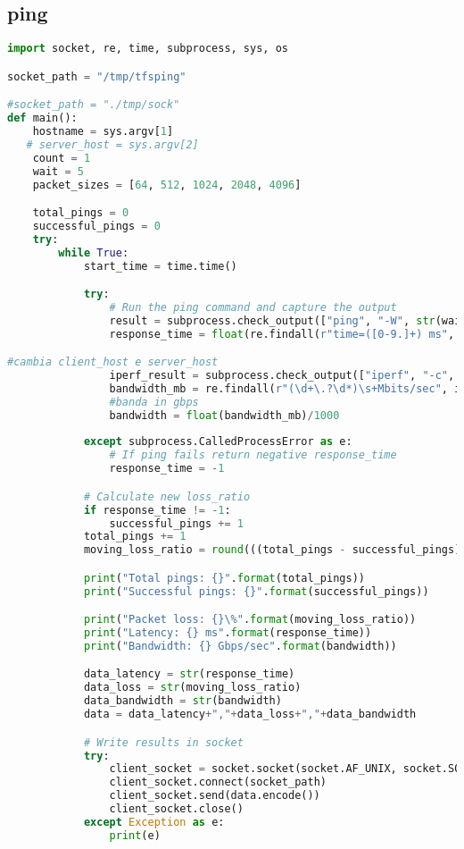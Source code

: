 \subsection{ping}
\begin{lstlisting}[language=Python]
import socket, re, time, subprocess, sys, os

socket_path = "/tmp/tfsping"

#socket_path = "./tmp/sock"
def main():
    hostname = sys.argv[1]
   # server_host = sys.argv[2]
    count = 1
    wait = 5
    packet_sizes = [64, 512, 1024, 2048, 4096]

    total_pings = 0
    successful_pings = 0
    try:
        while True:
            start_time = time.time()

            try:
                # Run the ping command and capture the output
                result = subprocess.check_output(["ping", "-W", str(wait), "-c", str(count), hostname], universal_newlines=True)
                response_time = float(re.findall(r"time=([0-9.]+) ms", result)[0])

#cambia client_host e server_host
                iperf_result = subprocess.check_output(["iperf", "-c", hostname], universal_newlines=True)
                bandwidth_mb = re.findall(r"(\d+\.?\d*)\s+Mbits/sec", iperf_result)[-1]
                #banda in gbps
                bandwidth = float(bandwidth_mb)/1000
           
            except subprocess.CalledProcessError as e:
                # If ping fails return negative response_time
                response_time = -1

            # Calculate new loss_ratio
            if response_time != -1:
                successful_pings += 1
            total_pings += 1
            moving_loss_ratio = round(((total_pings - successful_pings) / float(total_pings) * 100), 2)

            print("Total pings: {}".format(total_pings))
            print("Successful pings: {}".format(successful_pings))

            print("Packet loss: {}\%".format(moving_loss_ratio))
            print("Latency: {} ms".format(response_time))
            print("Bandwidth: {} Gbps/sec".format(bandwidth))

            data_latency = str(response_time)
            data_loss = str(moving_loss_ratio)
            data_bandwidth = str(bandwidth)
            data = data_latency+","+data_loss+","+data_bandwidth

            # Write results in socket
            try:
                client_socket = socket.socket(socket.AF_UNIX, socket.SOCK_STREAM)
                client_socket.connect(socket_path)
                client_socket.send(data.encode())
                client_socket.close()
            except Exception as e:
                print(e)


\end{lstlisting}
